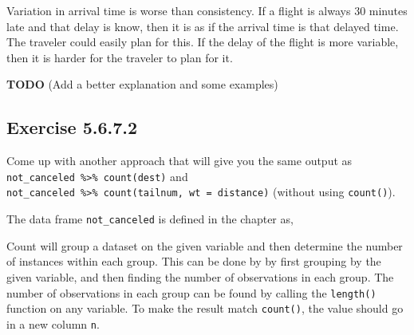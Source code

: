 \documentclass[]{book}
\newenvironment{Shaded}{\begin{snugshade}}{\end{snugshade}}
\newcommand{\CommentTok}[1]{\textcolor[rgb]{0.56,0.35,0.01}{\textit{#1}}}
\newcommand{\DataTypeTok}[1]{\textcolor[rgb]{0.13,0.29,0.53}{#1}}
\newcommand{\KeywordTok}[1]{\textcolor[rgb]{0.13,0.29,0.53}{\textbf{#1}}}
\newcommand{\NormalTok}[1]{#1}
\newcommand{\OperatorTok}[1]{\textcolor[rgb]{0.81,0.36,0.00}{\textbf{#1}}}
\newcommand{\StringTok}[1]{\textcolor[rgb]{0.31,0.60,0.02}{#1}}
\theoremstyle{plain}
\theoremstyle{remark}
\begin{document}
Variation in arrival time is worse than consistency. If a flight is
always 30 minutes late and that delay is know, then it is as if the
arrival time is that delayed time. The traveler could easily plan for
this. If the delay of the flight is more variable, then it is harder for
the traveler to plan for it.

\textbf{TODO} (Add a better explanation and some examples)

\hypertarget{exercise-5.6.7.2}{%
\subsection*{\texorpdfstring{Exercise
{5.6.7.2}}{Exercise 5.6.7.2}}\label{exercise-5.6.7.2}}

Come up with another approach that will give you the same output as
\texttt{not\_canceled\ \%\textgreater{}\%\ count(dest)} and
\texttt{not\_canceled\ \%\textgreater{}\%\ count(tailnum,\ wt\ =\ distance)}
(without using \texttt{count()}).

The data frame \texttt{not\_canceled} is defined in the chapter as,

\begin{Shaded}
\end{Shaded}

Count will group a dataset on the given variable and then determine the
number of instances within each group. This can be done by by first
grouping by the given variable, and then finding the number of
observations in each group. The number of observations in each group can
be found by calling the \texttt{length()} function on any variable. To
make the result match \texttt{count()}, the value should go in a new
column \texttt{n}.

\begin{Shaded}
\end{Shaded}
\end{document}
